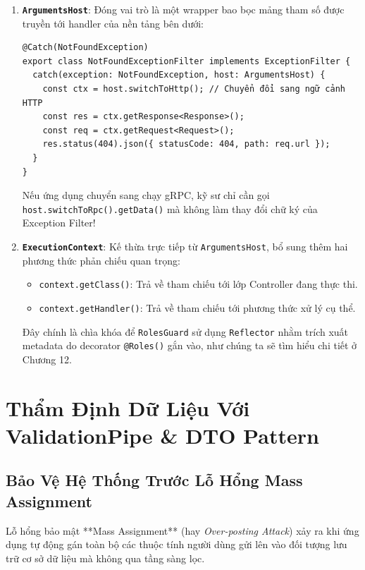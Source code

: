 \documentclass[12pt,a4paper,oneside]{book}
\begin{document}
\begin{enumerate}
  \item \textbf{\texttt{ArgumentsHost}}: Đóng vai trò là một wrapper bao bọc mảng tham số được truyền tới handler của nền tảng bên dưới:
\begin{codebox}
\begin{Verbatim}[fontsize=\small]
@Catch(NotFoundException)
export class NotFoundExceptionFilter implements ExceptionFilter {
  catch(exception: NotFoundException, host: ArgumentsHost) {
    const ctx = host.switchToHttp(); // Chuyển đổi sang ngữ cảnh HTTP
    const res = ctx.getResponse<Response>();
    const req = ctx.getRequest<Request>();
    res.status(404).json({ statusCode: 404, path: req.url });
  }
}
\end{Verbatim}
\end{codebox}
  Nếu ứng dụng chuyển sang chạy gRPC, kỹ sư chỉ cần gọi \texttt{host.switchToRpc().getData()} mà không làm thay đổi chữ ký của Exception Filter!
  \item \textbf{\texttt{ExecutionContext}}: Kế thừa trực tiếp từ \texttt{ArgumentsHost}, bổ sung thêm hai phương thức phản chiếu quan trọng:
    \begin{itemize}
      \item \texttt{context.getClass()}: Trả về tham chiếu tới lớp Controller đang thực thi.
      \item \texttt{context.getHandler()}: Trả về tham chiếu tới phương thức xử lý cụ thể.
    \end{itemize}
    Đây chính là chìa khóa để \texttt{RolesGuard} sử dụng \texttt{Reflector} nhằm trích xuất metadata do decorator \texttt{@Roles()} gắn vào, như chúng ta sẽ tìm hiểu chi tiết ở Chương 12.
\end{enumerate}

\chapter{Thẩm Định Dữ Liệu Với ValidationPipe \& DTO Pattern}

\section{Bảo Vệ Hệ Thống Trước Lỗ Hổng Mass Assignment}
Lỗ hổng bảo mật **Mass Assignment** (hay \textit{Over-posting Attack}) xảy ra khi ứng dụng tự động gán toàn bộ các thuộc tính người dùng gửi lên vào đối tượng lưu trữ cơ sở dữ liệu mà không qua tầng sàng lọc. 
\end{document}
